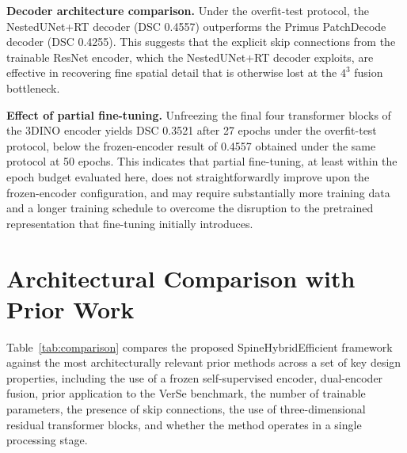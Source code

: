 \documentclass[preprint,12pt,3p]{elsarticle}
\begin{document}
\textbf{Decoder architecture comparison.} Under the overfit-test protocol, the NestedUNet+RT decoder (DSC 0.4557) outperforms the Primus PatchDecode decoder (DSC 0.4255). This suggests that the explicit skip connections from the trainable ResNet encoder, which the NestedUNet+RT decoder exploits, are effective in recovering fine spatial detail that is otherwise lost at the $4^3$ fusion bottleneck.

\textbf{Effect of partial fine-tuning.} Unfreezing the final four transformer blocks of the 3DINO encoder yields DSC 0.3521 after 27 epochs under the overfit-test protocol, below the frozen-encoder result of 0.4557 obtained under the same protocol at 50 epochs. This indicates that partial fine-tuning, at least within the epoch budget evaluated here, does not straightforwardly improve upon the frozen-encoder configuration, and may require substantially more training data and a longer training schedule to overcome the disruption to the pretrained representation that fine-tuning initially introduces.

\section{Architectural Comparison with Prior Work}
\label{sec:architecture-comparison}

Table~\ref{tab:comparison} compares the proposed SpineHybridEfficient framework against the most architecturally relevant prior methods across a set of key design properties, including the use of a frozen self-supervised encoder, dual-encoder fusion, prior application to the VerSe benchmark, the number of trainable parameters, the presence of skip connections, the use of three-dimensional residual transformer blocks, and whether the method operates in a single processing stage.
\end{document}
